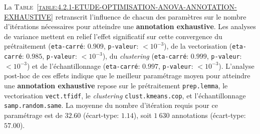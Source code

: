 			La \textsc{Table~\ref{table:4.2.1-ETUDE-OPTIMISATION-ANOVA-ANNOTATION-EXHAUSTIVE}} retranscrit l'influence de chacun des paramètres sur le nombre d'itérations nécessaires pour atteindre une \textbf{annotation exhaustive}.
			Les analyses de variance mettent en relief l'effet significatif sur cette convergence du prétraitement (\texttt{eta-carré}: $0.909$, \texttt{p-valeur}: $< 10^{-3}$), de la vectorisation (\texttt{eta-carré}: $0.985$, \texttt{p-valeur}: $< 10^{-3}$), du \textit{clustering} (\texttt{eta-carré}: $0.999$, \texttt{p-valeur}: $< 10^{-3}$) et de l'échantillonnage (\texttt{eta-carré}: $0.997$, \texttt{p-valeur}: $< 10^{-3}$).
			L'analyse post-hoc de ces effets indique que le meilleur paramétrage moyen pour atteindre une \textbf{annotation exhaustive} repose sur le prétraitement \texttt{prep.lemma}, le vectorisation \texttt{vect.tfidf}, le \textit{clustering} \texttt{clust.kmeans.cop}, et l'échantillonnage \texttt{samp.random.same}. La moyenne du nombre d'itération requis pour ce paramétrage est de $32.60$ (écart-type: $1.14$), soit $1~630$ annotations (écart-type: $57.00$).
